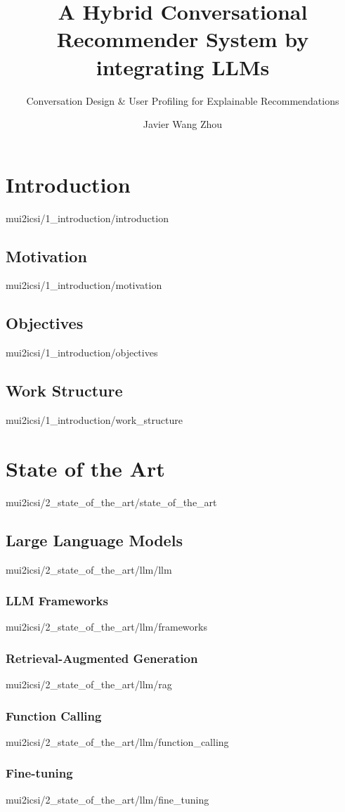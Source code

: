 \documentclass[english,epsbased,copyright,final,printable,covers,extendedindex,firstnumbered,tfm,gnuplot,loc,loe,lof,lot]{tfgtfmthesisuam}
\title{A Hybrid Conversational Recommender System by integrating LLMs}
\subtitle{Conversation Design \& User Profiling for Explainable Recommendations}
\author{Javier Wang Zhou}
\begin{document}
  \chapter{Introduction\label{CAP:INTRODUCTION}}{mui2icsi/1_introduction/introduction}
    \section{Motivation\label{SEC:MOTIVATION}}{mui2icsi/1_introduction/motivation}
    \section{Objectives\label{SEC:OBJECTIVES}}{mui2icsi/1_introduction/objectives}
    \section{Work Structure\label{SEC:WORK_STRUCT}}{mui2icsi/1_introduction/work_structure}

  \chapter{State of the Art\label{CAP:STATE_OF_THE_ART}}{mui2icsi/2_state_of_the_art/state_of_the_art}
    \section{Large Language Models\label{SEC:LLM}}{mui2icsi/2_state_of_the_art/llm/llm}
      \subsection{LLM Frameworks\label{SS:LLMFRAMEWORKS}}{mui2icsi/2_state_of_the_art/llm/frameworks}
      \subsection{Retrieval-Augmented Generation\label{SS:RAG}}{mui2icsi/2_state_of_the_art/llm/rag}
      \subsection{Function Calling\label{SS:FUNCTION_CALLING}}{mui2icsi/2_state_of_the_art/llm/function_calling}
      \subsection{Fine-tuning\label{SS:FINE_TUNING}}{mui2icsi/2_state_of_the_art/llm/fine_tuning}
\end{document}
